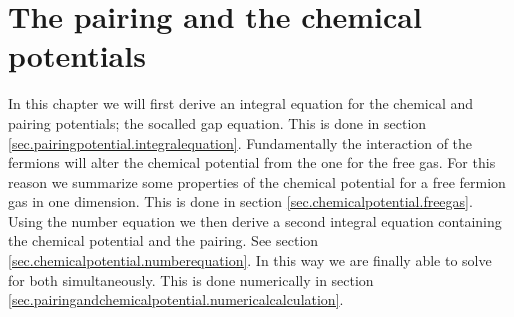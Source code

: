 
\chapter{The pairing and the chemical potentials} %

\label{Chapter5} %


In this chapter we will first derive an integral equation for the chemical and pairing potentials; the socalled gap equation. This is done in section \ref{sec.pairingpotential.integralequation}. Fundamentally the interaction of the fermions will alter the chemical potential from the one for the free gas. For this reason we summarize some properties of the chemical potential for a free fermion gas in one dimension. This is done in section \ref{sec.chemicalpotential.freegas}. Using the number equation we then derive a second integral equation containing the chemical potential and the pairing. See section \ref{sec.chemicalpotential.numberequation}. In this way we are finally able to solve for both simultaneously. This is done numerically in section \ref{sec.pairingandchemicalpotential.numericalcalculation}.

